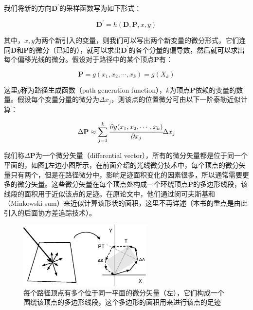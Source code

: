 我们将新的方向$\mathbf{D}^{'}$的采样函数写为如下形式：

\begin{equation}
	\mathbf{D}^{'}=h(\mathbf{D},\mathbf{P},x,y)
\end{equation}

\noindent 其中，$x,y$为两个新引入的变量，则我们可以写出两个新变量的微分形式，它们连同$\mathbf{D}$和$\mathbf{P}$的微分（已知的），就可以求出$\mathbf{D}^{'}$的各个分量的偏导数，然后就可以求出每个偏移光线的微分。假设对于路径中的某个顶点$\mathbf{P}$有：

\begin{equation}
	\mathbf{P}=g(x_1,x_2,\cdots, x_k)=g(X_k)
\end{equation}

\noindent 这里$g$称为路径生成函数（path generation function），$k$为顶点$\mathbf{P}$依赖的变量的数量。假设每个变量分量的微分为$\Delta x_j$，则该点的位置微分可由以下一阶泰勒近似计算：

\begin{equation}\label{e:pt-differential-vector}
	\Delta\mathbf{P}\approx\sum^{k}_{j=1}  \cfrac{{\rm \partial} g(x_1,x_2,\cdots, x_k)}{{\rm \partial} x_j}\Delta x_j
\end{equation}

\noindent 我们称$\Delta\mathbf{P}$为一个微分矢量（differential vector），所有的微分矢量都是位于同一个平面的，如图\ref{f:pt-differential-vectors}左边小图所示，在前面介绍的光线微分技术中，每个顶点的微分矢量只有两个，但是在路径微分中，影响足迹面积变化的因素很多，所以通常需要更多的微分矢量。这些微分矢量在每个顶点处构成一个环绕顶点$\mathbf{P}$的多边形线段，该线段的面积用于近似该点的足迹。在原论文\cite{a:Pathdifferentialsandapplications}中，他们通过闵可夫斯基和（Minkowski sum）来近似计算该形状的面积，这里不再详述（本书的重点是由此引入的后面协方差追踪技术）。

\begin{figure}
	\sidecaption
	\includegraphics[width=0.6\textwidth]{figures/pt/differential-vectors}
	\caption{每个路径顶点有多个位于同一平面的微分矢量（左），它们构成一个围绕该顶点的多边形线段，这个多边形的面积用来进行该点的足迹}
	\label{f:pt-differential-vectors}
\end{figure}

